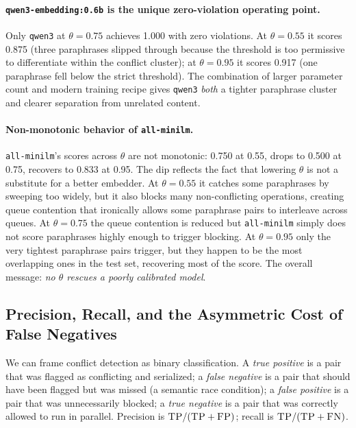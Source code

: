 \documentclass[sigconf]{acmart}
\begin{document}
\paragraph{\texttt{qwen3-embedding:0.6b} is the unique zero-violation
operating point.}
Only \texttt{qwen3} at $\theta=0.75$ achieves 1.000 with zero
violations. At $\theta=0.55$ it scores 0.875 (three paraphrases
slipped through because the threshold is too permissive to differentiate
within the conflict cluster); at $\theta=0.95$ it scores 0.917 (one
paraphrase fell below the strict threshold). The combination of larger
parameter count and modern training recipe gives \texttt{qwen3}
\emph{both} a tighter paraphrase cluster and clearer separation from
unrelated content.

\paragraph{Non-monotonic behavior of \texttt{all-minilm}.}
\texttt{all-minilm}'s scores across $\theta$ are not monotonic: 0.750
at 0.55, drops to 0.500 at 0.75, recovers to 0.833 at 0.95. The dip
reflects the fact that lowering $\theta$ is not a substitute for a
better embedder. At $\theta=0.55$ it catches some paraphrases by
sweeping too widely, but it also blocks many non-conflicting
operations, creating queue contention that ironically allows some
paraphrase pairs to interleave across queues. At $\theta=0.75$ the
queue contention is reduced but \texttt{all-minilm} simply does not
score paraphrases highly enough to trigger blocking. At $\theta=0.95$
only the very tightest paraphrase pairs trigger, but they happen to
be the most overlapping ones in the test set, recovering most of the
score. The overall message: \emph{no $\theta$ rescues a poorly
calibrated model}.

\subsection{Precision, Recall, and the Asymmetric Cost of False
Negatives}
\label{sec:emb-pr}

We can frame conflict detection as binary classification. A
\emph{true positive} is a pair that was flagged as conflicting and
serialized; a \emph{false negative} is a pair that should have been
flagged but was missed (a semantic race condition); a \emph{false
positive} is a pair that was unnecessarily blocked; a \emph{true
negative} is a pair that was correctly allowed to run in parallel.
Precision is $\textsc{TP}/(\textsc{TP}+\textsc{FP})$; recall is
$\textsc{TP}/(\textsc{TP}+\textsc{FN})$.
\end{document}
